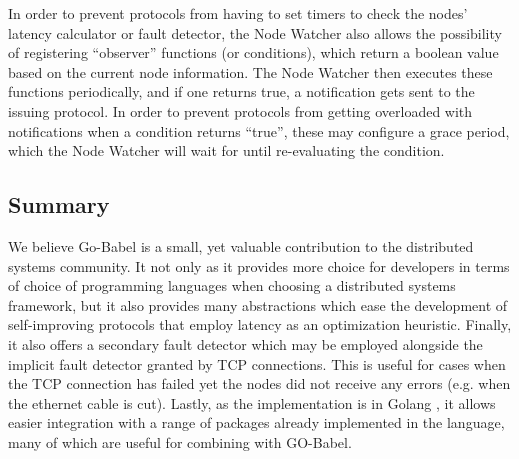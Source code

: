 In order to prevent protocols from having to set timers to check the nodes' latency calculator or fault detector, the Node Watcher also allows the possibility of registering ``observer'' functions (or conditions), which return a boolean value based on the current node information. The Node Watcher then executes these functions periodically, and if one returns true, a notification gets sent to the issuing protocol. In order to prevent protocols from getting overloaded with notifications when a condition returns ``true'', these may configure a grace period, which the Node Watcher will wait for until re-evaluating the condition.

\subsection{Summary}

We believe Go-Babel is a small, yet valuable contribution to the distributed systems community. It not only as it provides more choice for developers in terms of choice of programming languages when choosing a distributed systems framework, but it also provides many abstractions which ease the development of self-improving protocols that employ latency as an optimization heuristic. Finally, it also offers a secondary fault detector which may be employed alongside the implicit fault detector granted by TCP connections. This is useful for cases when the TCP connection has failed yet the nodes did not receive any errors (e.g. when the ethernet cable is cut). Lastly, as the implementation is in Golang \cite{golang}, it allows easier integration with a range of packages already implemented in the language, many of which are useful for combining with GO-Babel. 
